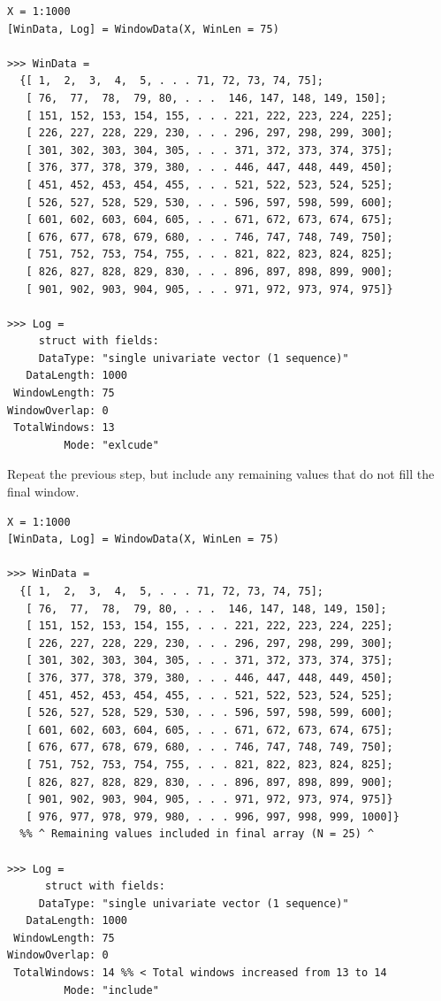 \documentclass[12pt, a4paper, titlepage, openany]{book}
\begin{document}
\begin{verbatim}
X = 1:1000
[WinData, Log] = WindowData(X, WinLen = 75)

>>> WinData =
  {[ 1,  2,  3,  4,  5, . . . 71, 72, 73, 74, 75];
   [ 76,  77,  78,  79, 80, . . .  146, 147, 148, 149, 150];
   [ 151, 152, 153, 154, 155, . . . 221, 222, 223, 224, 225];
   [ 226, 227, 228, 229, 230, . . . 296, 297, 298, 299, 300];
   [ 301, 302, 303, 304, 305, . . . 371, 372, 373, 374, 375];
   [ 376, 377, 378, 379, 380, . . . 446, 447, 448, 449, 450];
   [ 451, 452, 453, 454, 455, . . . 521, 522, 523, 524, 525];
   [ 526, 527, 528, 529, 530, . . . 596, 597, 598, 599, 600];
   [ 601, 602, 603, 604, 605, . . . 671, 672, 673, 674, 675];
   [ 676, 677, 678, 679, 680, . . . 746, 747, 748, 749, 750];
   [ 751, 752, 753, 754, 755, . . . 821, 822, 823, 824, 825];
   [ 826, 827, 828, 829, 830, . . . 896, 897, 898, 899, 900];
   [ 901, 902, 903, 904, 905, . . . 971, 972, 973, 974, 975]}

>>> Log =
     struct with fields:
     DataType: "single univariate vector (1 sequence)"
   DataLength: 1000
 WindowLength: 75
WindowOverlap: 0
 TotalWindows: 13
         Mode: "exlcude"
\end{verbatim}

\newpage
Repeat the previous step, but include any remaining values that do not fill the final window.
\begin{verbatim}
X = 1:1000
[WinData, Log] = WindowData(X, WinLen = 75)

>>> WinData =
  {[ 1,  2,  3,  4,  5, . . . 71, 72, 73, 74, 75];
   [ 76,  77,  78,  79, 80, . . .  146, 147, 148, 149, 150];
   [ 151, 152, 153, 154, 155, . . . 221, 222, 223, 224, 225];
   [ 226, 227, 228, 229, 230, . . . 296, 297, 298, 299, 300];
   [ 301, 302, 303, 304, 305, . . . 371, 372, 373, 374, 375];
   [ 376, 377, 378, 379, 380, . . . 446, 447, 448, 449, 450];
   [ 451, 452, 453, 454, 455, . . . 521, 522, 523, 524, 525];
   [ 526, 527, 528, 529, 530, . . . 596, 597, 598, 599, 600];
   [ 601, 602, 603, 604, 605, . . . 671, 672, 673, 674, 675];
   [ 676, 677, 678, 679, 680, . . . 746, 747, 748, 749, 750];
   [ 751, 752, 753, 754, 755, . . . 821, 822, 823, 824, 825];
   [ 826, 827, 828, 829, 830, . . . 896, 897, 898, 899, 900];
   [ 901, 902, 903, 904, 905, . . . 971, 972, 973, 974, 975]}
   [ 976, 977, 978, 979, 980, . . . 996, 997, 998, 999, 1000]}  
  %% ^ Remaining values included in final array (N = 25) ^
  
>>> Log =
      struct with fields:
     DataType: "single univariate vector (1 sequence)"
   DataLength: 1000
 WindowLength: 75
WindowOverlap: 0
 TotalWindows: 14 %% < Total windows increased from 13 to 14
         Mode: "include"
\end{verbatim}
\end{document}
